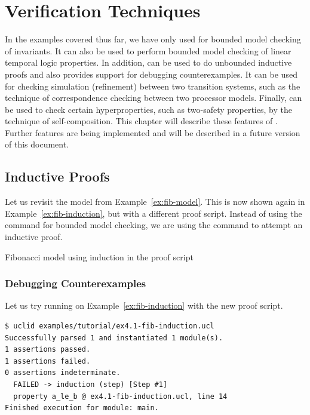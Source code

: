\chapter{Verification Techniques}
\label{ch:verif}

In the examples covered thus far, we have only used \uclid{} for bounded model checking of invariants. 
It can also be used to perform bounded model checking of linear temporal
logic properties.
In addition,
\uclid{} can be used to do unbounded inductive proofs and also provides support for debugging counterexamples. 
It can be used for checking simulation (refinement) between two transition systems,
such as the technique of correspondence checking between two
processor models.
Finally, \uclid{} can be used to check certain hyperproperties,
such as two-safety properties, by the technique of self-composition.
This chapter will describe these features of \uclid{}. Further features are being implemented and will be described in a future version of this document.

\section{Inductive Proofs} %

Let us revisit the model from Example~\ref{ex:fib-model}. This is now shown again in Example~\ref{ex:fib-induction}, but with a different proof script. Instead of using the  command for bounded model checking, we are using the  command to attempt an inductive proof.

\begin{uclidlisting}[htbp]
    
    \label{ex:fib-induction}
    \caption{\uclid{} Fibonacci model using induction in the proof script}
\end{uclidlisting}

\subsection{Debugging Counterexamples}

Let us try running \uclid{} on Example~\ref{ex:fib-induction} with the new proof script.
\begin{Verbatim}[frame=single, samepage=true]
$ uclid examples/tutorial/ex4.1-fib-induction.ucl 
Successfully parsed 1 and instantiated 1 module(s).
1 assertions passed.
1 assertions failed.
0 assertions indeterminate.
  FAILED -> induction (step) [Step #1] 
  property a_le_b @ ex4.1-fib-induction.ucl, line 14
Finished execution for module: main.
\end{Verbatim}

